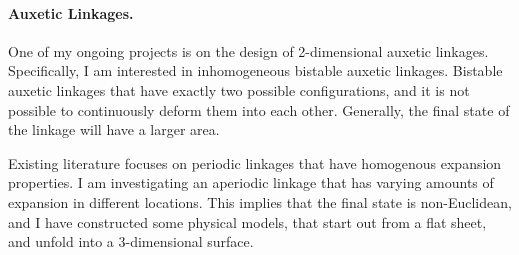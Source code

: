 \paragraph{Auxetic Linkages.}
One of my ongoing projects is on the design of 2-dimensional auxetic linkages.
Specifically, I am interested in inhomogeneous bistable auxetic linkages.
Bistable auxetic linkages that have exactly two possible configurations,
and it is not possible to continuously deform them into each other.
Generally, the final state of the linkage will have a larger area.

Existing literature focuses on periodic linkages that have homogenous expansion properties.
I am investigating an aperiodic linkage that has varying amounts of expansion in different locations.
This implies that the final state is non-Euclidean, and I have constructed some physical models,
that start out from a flat sheet, and unfold into a 3-dimensional surface.

